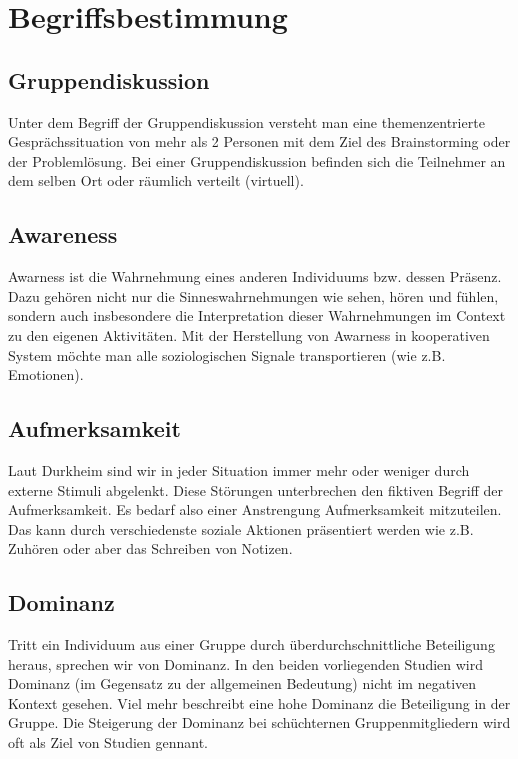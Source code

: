 \documentclass{seminarvorlage}
\begin{document}

\section{Begriffsbestimmung}
\subsection{Gruppendiskussion}
Unter dem Begriff der Gruppendiskussion versteht man eine themenzentrierte
Gesprächssituation von mehr als 2 Personen mit dem Ziel des Brainstorming oder
der Problemlösung. Bei einer Gruppendiskussion befinden sich die Teilnehmer an
dem selben Ort oder räumlich verteilt (virtuell).

\subsection{Awareness}
Awarness ist die Wahrnehmung eines anderen Individuums bzw. dessen Präsenz. Dazu
gehören nicht nur die Sinneswahrnehmungen wie sehen, hören und fühlen, sondern
auch insbesondere die Interpretation dieser Wahrnehmungen im Context zu den
eigenen Aktivitäten.
Mit der Herstellung von Awarness in kooperativen System möchte man alle
soziologischen Signale transportieren (wie z.B. Emotionen).

\subsection{Aufmerksamkeit}
Laut Durkheim sind wir in jeder Situation immer mehr oder weniger durch externe
Stimuli abgelenkt. Diese Störungen unterbrechen den fiktiven Begriff der
Aufmerksamkeit. Es bedarf also einer Anstrengung Aufmerksamkeit mitzuteilen. Das
kann durch verschiedenste soziale Aktionen präsentiert werden wie z.B. Zuhören
oder aber das Schreiben von Notizen.

\subsection{Dominanz}
Tritt ein Individuum aus einer Gruppe durch überdurchschnittliche Beteiligung
heraus, sprechen wir von Dominanz. In den beiden vorliegenden Studien wird
Dominanz (im Gegensatz zu der allgemeinen Bedeutung) nicht im negativen Kontext
gesehen. Viel mehr beschreibt eine hohe Dominanz die Beteiligung in der Gruppe.
Die Steigerung der Dominanz bei schüchternen Gruppenmitgliedern wird oft als
Ziel von Studien gennant.
\end{document}
